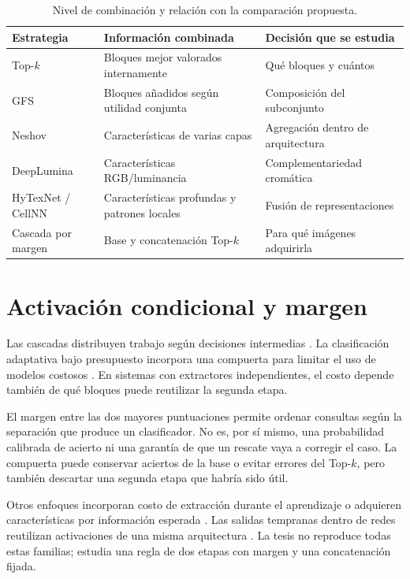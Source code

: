 \begin{table}[!htbp]\centering\small
\caption{Nivel de combinación y relación con la comparación propuesta.}
\label{tab:antecedentes}
\begin{tabular}{@{}>{\raggedright\arraybackslash}p{3.0cm}>{\raggedright\arraybackslash}p{5.4cm}>{\raggedright\arraybackslash}p{4.0cm}@{}}
\toprule
Estrategia & Información combinada & Decisión que se estudia\\\midrule
Top-\(k\) & Bloques mejor valorados internamente & Qué bloques y cuántos\\
GFS & Bloques añadidos según utilidad conjunta & Composición del subconjunto\\
Neshov & Características de varias capas & Agregación dentro de arquitectura\\
DeepLumina & Características RGB/luminancia & Complementariedad cromática\\
HyTexNet / CellNN & Características profundas y patrones locales & Fusión de representaciones\\
Cascada por margen & Base y concatenación Top-\(k\) & Para qué imágenes adquirirla\\
\bottomrule
\end{tabular}
\end{table}

\section{Activación condicional y margen}
Las cascadas distribuyen trabajo según decisiones intermedias \citep{viola2001rapid}. La clasificación adaptativa bajo presupuesto incorpora una compuerta para limitar el uso de modelos costosos \citep{nan2017adaptive}. En sistemas con extractores independientes, el costo depende también de qué bloques puede reutilizar la segunda etapa.

El margen entre las dos mayores puntuaciones permite ordenar consultas según la separación que produce un clasificador. No es, por sí mismo, una probabilidad calibrada de acierto ni una garantía de que un rescate vaya a corregir el caso. La compuerta puede conservar aciertos de la base o evitar errores del Top-\(k\), pero también descartar una segunda etapa que habría sido útil.

Otros enfoques incorporan costo de extracción durante el aprendizaje o adquieren características por información esperada \citep{xu2012greedy,ma2019eddi}. Las salidas tempranas dentro de redes reutilizan activaciones de una misma arquitectura \citep{teerapittayanon2016branchynet,han2021dynamic}. La tesis no reproduce todas estas familias; estudia una regla de dos etapas con margen y una concatenación fijada.

